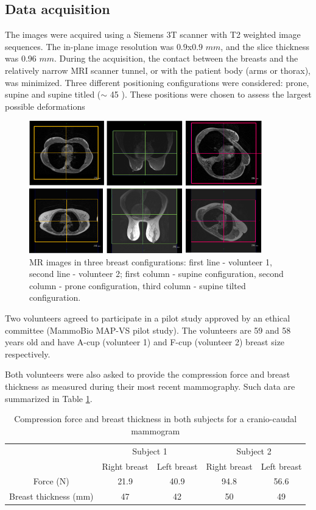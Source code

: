 \subsection{Data acquisition}\label{subsection:imageaquisition}

 The images were acquired using a Siemens 3T scanner with T2 weighted image sequences. The in-plane image resolution was $0.9$x$0.9$ $mm$, and the slice thickness was 0.96 $mm$. During the acquisition, the contact between the breasts and the  relatively narrow MRI scanner tunnel, or with the patient body (arms or thorax), was minimized. Three different positioning configurations were considered: prone, supine and supine titled ($\sim$ 45 \textdegree). These positions were chosen to assess the largest possible deformations
\begin{figure}[H]
\centering
\includegraphics[width=0.9\textwidth,keepaspectratio]{figures/patientData.png} 
\caption{MR images in three breast configurations: first line - volunteer 1, second line - volunteer 2; first column - supine configuration, second column - prone configuration, third column - supine tilted configuration.}\label{fig:patientdata}
\end{figure}

Two volunteers agreed to participate in a pilot study approved by an ethical committee (MammoBio MAP-VS pilot study). The volunteers are 59 and 58 years old and have A-cup (volunteer 1) and F-cup (volunteer 2) breast size respectively. 
 

Both volunteers were also asked to provide the compression force and breast thickness as measured during their most recent mammography. Such data are summarized in Table \ref{tab:forceandthichnessdata}.
\begin{table}[H]
\centering
\begin{tabular}{c|c|c||c|c|}
\cline{2-5}
&\multicolumn{2}{c||}{Subject 1}&\multicolumn{2}{c|}{Subject 2}\\
\cline{2-5}
& Right breast & Left breast & Right breast & Left breast\\
\cline{2-5}
\hline
\multicolumn{1}{|c||}{Force (N)}  & 21.9 &40.9 &94.8 & 56.6 \\
\hline
\multicolumn{1}{|c||}{ Breast thickness (mm)} & 47 & 42 & 50 & 49 \\
\hline

\end{tabular}
\caption{Compression force and breast thickness in both subjects for a cranio-caudal mammogram}\label{tab:forceandthichnessdata}
\end{table}

